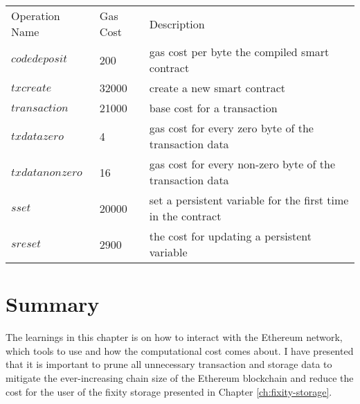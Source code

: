 \begin{center}
    \begin{tabular}{ l l l }\label{table:gas-costs}
        Operation Name & Gas Cost & Description \\ 
        $codedeposit$ & 200 & gas cost per byte the compiled smart contract \\  
        $txcreate$ & 32000 & create a new smart contract  \\   
        $transaction$ & 21000 & base cost for a transaction \\
        $txdatazero$ & 4 & gas cost for every zero byte of the transaction data  \\   
        $txdatanonzero$ & 16 & gas cost for every non-zero byte of the transaction data  \\   
        $sset$ & 20000 & set a persistent variable for the first time in the contract \\
        $sreset$ & 2900 & the cost for updating a persistent variable 
    \end{tabular}
\end{center}

\section{Summary}
The learnings in this chapter is on how to interact with the Ethereum network, which tools to use and how the computational cost comes about. I have presented that it is important to prune all unnecessary transaction and storage data to mitigate the ever-increasing chain size of the Ethereum blockchain and reduce the cost for the user of the fixity storage presented in Chapter \ref{ch:fixity-storage}. 